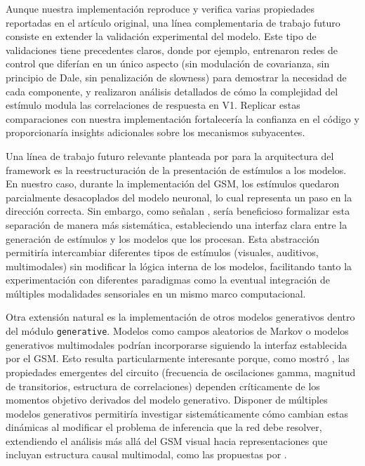 Aunque nuestra implementación reproduce y verifica varias propiedades reportadas en el artículo original, una línea complementaria de trabajo futuro consiste en extender la validación experimental del modelo. Este tipo de validaciones tiene precedentes claros, donde por ejemplo, \citet{echeveste2020cortical} entrenaron redes de control que diferían en un único aspecto (sin modulación de covarianza, sin principio de Dale, sin penalización de slowness) para demostrar la necesidad de cada componente, y \citet{banyai2019stimulus} realizaron análisis detallados de cómo la complejidad del estímulo modula las correlaciones de respuesta en \acrshort{V1}. Replicar estas comparaciones con nuestra implementación fortalecería la confianza en el código y proporcionaría insights adicionales sobre los mecanismos subyacentes.

Una línea de trabajo futuro relevante planteada por \citeauthor{paredes2025scikit} para la arquitectura del framework es la reestructuración de la presentación de estímulos a los modelos. En nuestro caso, durante la implementación del \acrshort{GSM}, los estímulos quedaron parcialmente desacoplados del modelo neuronal, lo cual representa un paso en la dirección correcta. Sin embargo, como señalan \citet{paredes2025scikit}, sería beneficioso formalizar esta separación de manera más sistemática, estableciendo una interfaz clara entre la generación de estímulos y los modelos que los procesan. Esta abstracción permitiría intercambiar diferentes tipos de estímulos (visuales, auditivos, multimodales) sin modificar la lógica interna de los modelos, facilitando tanto la experimentación con diferentes paradigmas como la eventual integración de múltiples modalidades sensoriales en un mismo marco computacional.

Otra extensión natural es la implementación de otros modelos generativos dentro del módulo \texttt{generative}. Modelos como campos aleatorios de Markov o modelos generativos multimodales podrían incorporarse siguiendo la interfaz establecida por el \acrshort{GSM}. Esto resulta particularmente interesante porque, como mostró \citet{echeveste2020cortical}, las propiedades emergentes del circuito (frecuencia de oscilaciones gamma, magnitud de transitorios, estructura de correlaciones) dependen críticamente de los momentos objetivo derivados del modelo generativo. Disponer de múltiples modelos generativos permitiría investigar sistemáticamente cómo cambian estas dinámicas al modificar el problema de inferencia que la red debe resolver, extendiendo el análisis más allá del \acrshort{GSM} visual hacia representaciones que incluyan estructura causal multimodal, como las propuestas por \citet{kording2007causal}.

